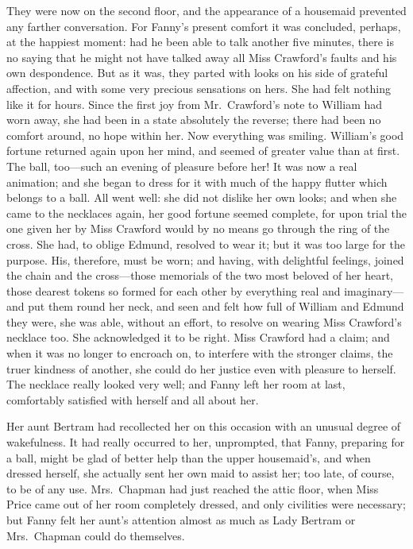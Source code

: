 They were now on the second floor, and the appearance
of a housemaid prevented any farther conversation.
For Fanny's present comfort it was concluded, perhaps,
at the happiest moment:  had he been able to talk another
five minutes, there is no saying that he might not have talked
away all Miss Crawford's faults and his own despondence.
But as it was, they parted with looks on his side of
grateful affection, and with some very precious sensations
on hers.  She had felt nothing like it for hours.
Since the first joy from Mr.\ Crawford's note to William had
worn away, she had been in a state absolutely the reverse;
there had been no comfort around, no hope within her.
Now everything was smiling.  William's good fortune
returned again upon her mind, and seemed of greater
value than at first.  The ball, too---such an evening
of pleasure before her!  It was now a real animation;
and she began to dress for it with much of the happy
flutter which belongs to a ball.  All went well:
she did not dislike her own looks; and when she came
to the necklaces again, her good fortune seemed complete,
for upon trial the one given her by Miss Crawford would
by no means go through the ring of the cross.  She had,
to oblige Edmund, resolved to wear it; but it was too
large for the purpose.  His, therefore, must be worn;
and having, with delightful feelings, joined the chain
and the cross---those memorials of the two most beloved
of her heart, those dearest tokens so formed for each
other by everything real and imaginary---and put them
round her neck, and seen and felt how full of William
and Edmund they were, she was able, without an effort,
to resolve on wearing Miss Crawford's necklace too.
She acknowledged it to be right.  Miss Crawford had a claim;
and when it was no longer to encroach on, to interfere
with the stronger claims, the truer kindness of another,
she could do her justice even with pleasure to herself.
The necklace really looked very well; and Fanny left her
room at last, comfortably satisfied with herself and all
about her.

Her aunt Bertram had recollected her on this occasion with
an unusual degree of wakefulness.  It had really occurred
to her, unprompted, that Fanny, preparing for a ball,
might be glad of better help than the upper housemaid's,
and when dressed herself, she actually sent her own maid
to assist her; too late, of course, to be of any use.
Mrs.\ Chapman had just reached the attic floor, when Miss
Price came out of her room completely dressed, and only
civilities were necessary; but Fanny felt her aunt's
attention almost as much as Lady Bertram or Mrs.\ Chapman
could do themselves.



